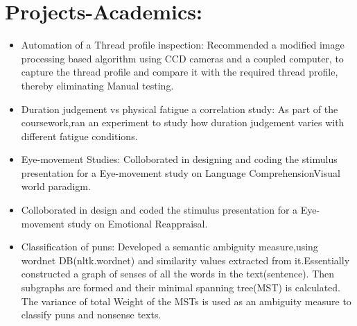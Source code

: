 \section {Projects-Academics:}

	\begin{itemize}
		\item Automation of a Thread profile inspection: Recommended a modified image processing based algorithm using CCD cameras and a coupled computer, to capture the thread profile and compare it with the required thread profile, thereby eliminating Manual testing.

	 	\item Duration judgement vs physical fatigue a correlation study: As part of the coursework,ran an experiment to study how duration judgement varies with different fatigue conditions.

		\item Eye-movement Studies: Colloborated in designing and coding the stimulus presentation for a Eye-movement study on Language ComprehensionVisual world paradigm.

		\item Colloborated in design and coded the stimulus presentation for a Eye-movement study on Emotional Reappraisal.

		\item Classification of puns: Developed a semantic ambiguity measure,using wordnet DB(nltk.wordnet) and similarity values extracted from it.Essentially constructed a graph of senses of all the words in the text(sentence). Then subgraphs are formed and their minimal spanning tree(MST) is calculated. The variance of total Weight of the MSTs is used as an ambiguity measure to classify puns and nonsense texts.
	\end{itemize}
